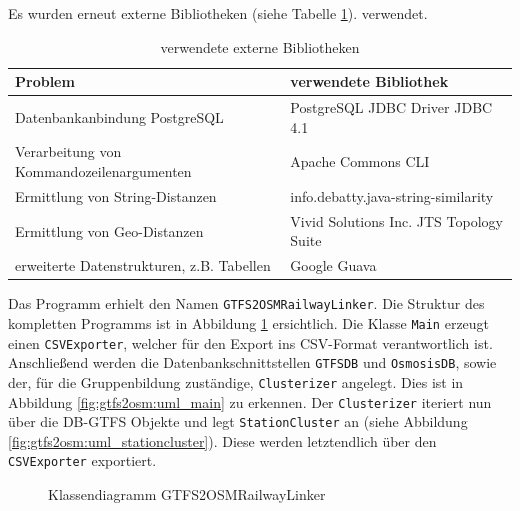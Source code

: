 Es wurden erneut externe Bibliotheken (siehe Tabelle \ref{tab:GTFS2OSM:Libraries}). verwendet. 
\begin{table}[htb]
\small
\centering
\caption{verwendete externe Bibliotheken}
\label{tab:GTFS2OSM:Libraries}
\begin{tabular}{|l|l|}
\hline
\textbf{Problem}                          & \textbf{verwendete Bibliothek}     \\ \hline
Datenbankanbindung PostgreSQL             & PostgreSQL JDBC Driver JDBC 4.1    \\ \hline
Verarbeitung von Kommandozeilenargumenten & Apache Commons CLI                 \\ \hline
Ermittlung von String-Distanzen           & info.debatty.java-string-similarity         \\ \hline
Ermittlung von Geo-Distanzen           & Vivid Solutions Inc. JTS Topology Suite         \\ \hline
erweiterte Datenstrukturen, z.B. Tabellen & Google Guava          \\ \hline
\end{tabular}
\end{table}

Das Programm erhielt den Namen \texttt{GTFS2OSMRailwayLinker}. 
Die Struktur des kompletten Programms ist in Abbildung \ref{fig:gtfs2osm:uml_full} ersichtlich.
Die Klasse \texttt{Main} erzeugt einen \texttt{CSVExporter}, welcher für den Export ins CSV-Format verantwortlich ist.
Anschließend werden die Datenbankschnittstellen \texttt{GTFSDB} und \texttt{OsmosisDB}, sowie der, für die Gruppenbildung zuständige, \texttt{Clusterizer} angelegt.
Dies ist in Abbildung \ref{fig:gtfs2osm:uml_main} zu erkennen.
Der \texttt{Clusterizer} iteriert nun über die DB-GTFS Objekte und legt \texttt{StationCluster} an (siehe Abbildung \ref{fig:gtfs2osm:uml_stationcluster}).
Diese werden letztendlich über den \texttt{CSVExporter} exportiert.

\begin{figure}[htb]
   \centering
   \caption{Klassendiagramm GTFS2OSMRailwayLinker}
   \label{fig:gtfs2osm:uml_full}
 \end{figure}

